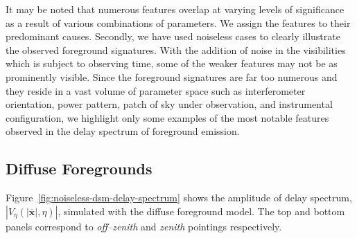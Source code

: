 \documentclass[preprint2,iop,numberedappendix]{emulateapj}
\begin{document}

It may be noted that numerous features overlap at varying levels of significance as a result of various combinations of parameters. We assign the features to their predominant causes. Secondly, we have used noiseless cases to clearly illustrate the observed foreground signatures. With the addition of noise in the visibilities which is subject to observing time, some of the weaker features may not be as prominently visible. Since the foreground signatures are far too numerous and they reside in a vast volume of parameter space such as interferometer orientation, power pattern, patch of sky under observation, and instrumental configuration, we highlight only some examples of the most notable features observed in the delay spectrum of foreground emission.

\subsection{Diffuse Foregrounds}\label{sec:diffuse}

Figure~\ref{fig:noiseless-dsm-delay-spectrum} shows the amplitude of delay spectrum, $|V_\eta(|\overline{\mathbf{x}}|,\eta)|$, simulated with the diffuse foreground model. The top and bottom panels correspond to {\it off--zenith} and {\it zenith} pointings respectively. 
\end{document}
